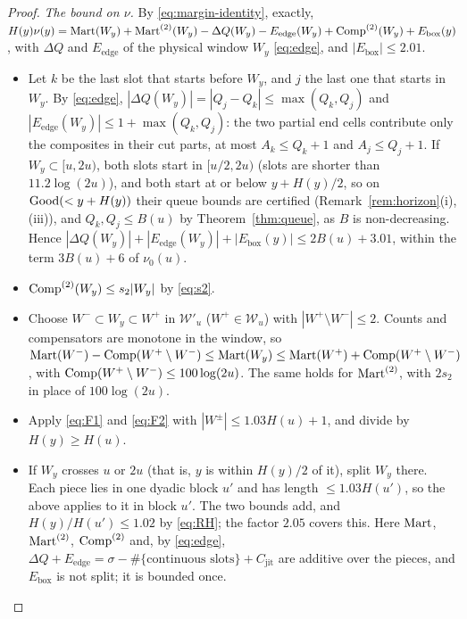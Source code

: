 \begin{proof}
\emph{The bound on $\nu$.} By \eqref{eq:margin-identity}, exactly,
$H(y)\nu(y)=\mathrm{Mart}(W_y)+\mathrm{Mart}^{(2)}(W_y)-\Delta Q(W_y)-E_{\mathrm{edge}}(W_y)+\mathrm{Comp}^{(2)}(W_y)+E_{\mathrm{box}}(y)$, with
$\Delta Q$ and $E_{\mathrm{edge}}$ of the physical window $W_y$ \eqref{eq:edge}, and $|E_{\mathrm{box}}|\le2.01$.
\begin{itemize}
\item Let $k$ be the last slot that starts before $W_y$, and $j$ the last one that starts in $W_y$. By \eqref{eq:edge},
  $|\Delta Q(W_y)|=|Q_j-Q_k|\le\max(Q_k,Q_j)$ and $|E_{\mathrm{edge}}(W_y)|\le1+\max(Q_k,Q_j)$: the two partial end cells
  contribute only the composites in their cut parts, at most $A_k\le Q_k+1$ and $A_j\le Q_j+1$. If $W_y\subset[u,2u)$, both slots
  start in $[u/2,2u)$ (slots are shorter than $11.2\log(2u)$), and both start at or below $y+H(y)/2$, so on $\mathrm{Good}(<y+H(y))$ their queue bounds are certified
  (Remark~\ref{rem:horizon}(i), (iii)), and $Q_k,Q_j\le B(u)$ by Theorem~\ref{thm:queue}, as $B$ is non-decreasing. Hence
  $|\Delta Q(W_y)|+|E_{\mathrm{edge}}(W_y)|+|E_{\mathrm{box}}(y)|\le2B(u)+3.01$, within the term $3B(u)+6$ of $\nu_0(u)$.
\item $\mathrm{Comp}^{(2)}(W_y)\le s_2|W_y|$ by \eqref{eq:s2}.
\item Choose $W^-\subset W_y\subset W^+$ in $\mathcal W'_u$ ($W^+\in\mathcal W_u$) with $|W^+\setminus W^-|\le2$. Counts and compensators are
  monotone in the window, so $\mathrm{Mart}(W^-)-\mathrm{Comp}(W^+\setminus W^-)\le\mathrm{Mart}(W_y)\le\mathrm{Mart}(W^+)+\mathrm{Comp}(W^+\setminus W^-)$, with
  $\mathrm{Comp}(W^+\setminus W^-)\le100\log(2u)$. The same holds for $\mathrm{Mart}^{(2)}$, with $2s_2$ in place of $100\log(2u)$.
\item Apply \eqref{eq:F1} and \eqref{eq:F2} with $|W^\pm|\le1.03H(u)+1$, and divide by $H(y)\ge H(u)$.
\item If $W_y$ crosses $u$ or $2u$ (that is, $y$ is within $H(y)/2$ of it), split $W_y$ there. Each piece lies in one
  dyadic block $u'$ and has length $\le1.03H(u')$, so the above applies to it in block $u'$. The two bounds add, and
  $H(y)/H(u')\le1.02$ by \eqref{eq:RH}; the factor $2.05$ covers this. Here $\mathrm{Mart}$, $\mathrm{Mart}^{(2)}$, $\mathrm{Comp}^{(2)}$ and, by
  \eqref{eq:edge}, $\Delta Q+E_{\mathrm{edge}}=\sigma-\#\{\text{continuous slots}\}+C_{\mathrm{jit}}$ are additive over the pieces,
  and $E_{\mathrm{box}}$ is not split; it is bounded once.
\end{itemize}


\end{proof}

